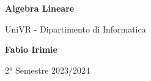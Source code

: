 \begin{titlepage}
	\begin{center}
		\vspace*{1cm}

		\Huge
		\textbf{Algebra Lineare}

		\vspace{0.5cm}
		\LARGE
		UniVR - Dipartimento di Informatica

		\vspace{1.5cm}

		\textbf{Fabio Irimie}

		\vfill


		\vspace{0.8cm}


		2° Semestre 2023/2024

	\end{center}
\end{titlepage}
